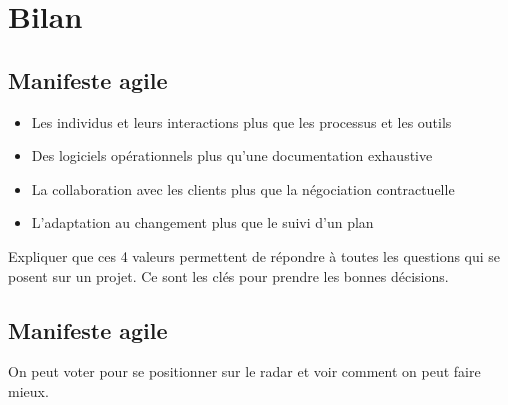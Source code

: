 \documentclass[a4paper,12pt]{article}
\begin{document}
\section{Bilan}
\subsection{Manifeste agile}
\begin{itemize}
  \item Les individus et leurs interactions plus que les processus et les outils
  \item Des logiciels opérationnels plus qu’une documentation exhaustive
  \item La collaboration avec les clients plus que la négociation contractuelle
  \item L’adaptation au changement plus que le suivi d’un plan
\end{itemize}

Expliquer que ces 4 valeurs permettent de répondre à toutes les questions qui se posent sur un projet. Ce sont les clés pour prendre les bonnes décisions.

\subsection{Manifeste agile}
On peut voter pour se positionner sur le radar et voir comment on peut faire mieux.
\end{document}
